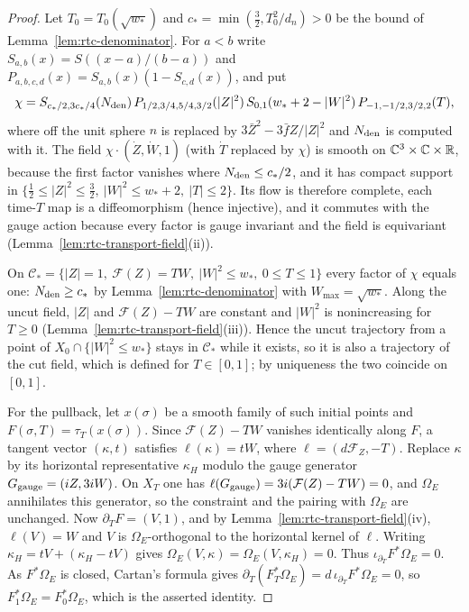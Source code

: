 \begin{proof}
Let $T_0=T_0(\sqrt{w_*})$ and $c_*=\min(\frac32,T_0^2/d_n)>0$ be the bound of Lemma~\ref{lem:rtc-denominator}. For
$a<b$ write $S_{a,b}(x)=S((x-a)/(b-a))$ and $P_{a,b,c,d}(x)=S_{a,b}(x)(1-S_{c,d}(x))$, and put
\[
 \chi=S_{c_*/2,3c_*/4}(N_{\rm den})\,P_{1/2,3/4,5/4,3/2}(|Z|^2)\,S_{0,1}(w_*+2-|W|^2)\,P_{-1,-1/2,3/2,2}(T),
\]
where off the unit sphere $n$ is replaced by $3\bar Z^2-3\bar f Z/|Z|^2$ and $N_{\rm den}$ is computed with it. The field
$\chi\cdot(\dot Z,\dot W,1)$ (with $\dot T$ replaced by $\chi$) is smooth on $\mathbb{C}^3\times\mathbb{C}\times\mathbb{R}$, because the first factor
vanishes where $N_{\rm den}\le c_*/2$, and it has compact support in $\{\frac12\le|Z|^2\le\frac32,\ |W|^2\le w_*+2,\ |T|\le2\}$. Its
flow is therefore complete, each time-$T$ map is a diffeomorphism (hence injective), and it commutes with the gauge action
because every factor is gauge invariant and the field is equivariant (Lemma~\ref{lem:rtc-transport-field}(ii)).

On $\mathcal C_*=\{|Z|=1,\ \mathcal F(Z)=TW,\ |W|^2\le w_*,\ 0\le T\le1\}$ every factor of $\chi$ equals one: $N_{\rm den}\ge c_*$ by
Lemma~\ref{lem:rtc-denominator} with $W_{\max}=\sqrt{w_*}$. Along the uncut field, $|Z|$ and $\mathcal F(Z)-TW$ are constant and $|W|^2$
is nonincreasing for $T\ge0$ (Lemma~\ref{lem:rtc-transport-field}(iii)). Hence the uncut trajectory from a point of
$X_0\cap\{|W|^2\le w_*\}$ stays in $\mathcal C_*$ while it exists, so it is also a trajectory of the cut field, which is defined for
$T\in[0,1]$; by uniqueness the two coincide on $[0,1]$.

For the pullback, let $x(\sigma)$ be a smooth family of such initial points and $F(\sigma,T)=\tau_T(x(\sigma))$. Since
$\mathcal F(Z)-TW$ vanishes identically along $F$, a tangent vector $(\kappa,t)$ satisfies
$\ell(\kappa)=tW$, where $\ell=(d\mathcal F_Z,-T)$. Replace $\kappa$ by its horizontal representative
$\kappa_H$ modulo the gauge generator $G_{\rm gauge}=(iZ,3iW)$. On $X_T$ one has
$\ell(G_{\rm gauge})=3i(\mathcal F(Z)-TW)=0$, and $\Omega_E$ annihilates this generator, so the constraint and
the pairing with $\Omega_E$ are unchanged. Now $\partial_TF=(V,1)$, and by Lemma~\ref{lem:rtc-transport-field}(iv),
$\ell(V)=W$ and $V$ is $\Omega_E$-orthogonal to the horizontal kernel of $\ell$. Writing
$\kappa_H=tV+(\kappa_H-tV)$ gives $\Omega_E(V,\kappa)=\Omega_E(V,\kappa_H)=0$. Thus
$\iota_{\partial_T}F^*\Omega_E=0$. As $F^*\Omega_E$ is closed, Cartan's formula gives
$\partial_T(F_T^*\Omega_E)=d\,\iota_{\partial_T}F^*\Omega_E=0$, so $F_1^*\Omega_E=F_0^*\Omega_E$, which is the asserted identity.
\end{proof}


